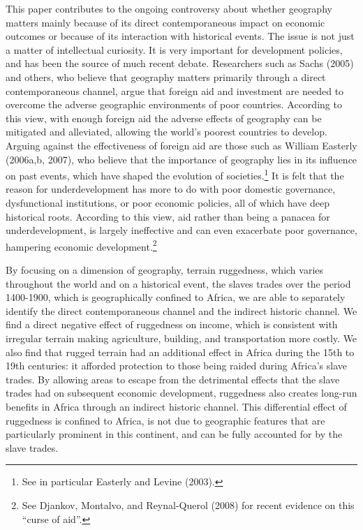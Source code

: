 \documentclass[
  letterpaper,
  DIV=11,
  numbers=noendperiod]{scrartcl}
\begin{document}
This paper contributes to the ongoing controversy about whether
geography matters mainly because of its direct contemporaneous impact on
economic outcomes or because of its interaction with historical events.
The issue is not just a matter of intellectual curiosity. It is very
important for development policies, and has been the source of much
recent debate. Researchers such as Sachs (2005) and others, who believe
that geography matters primarily through a direct contemporaneous
channel, argue that foreign aid and investment are needed to overcome
the adverse geographic environments of poor countries. According to this
view, with enough foreign aid the adverse effects of geography can be
mitigated and alleviated, allowing the world's poorest countries to
develop. Arguing against the effectiveness of foreign aid are those such
as William Easterly (2006a,b, 2007), who believe that the importance of
geography lies in its influence on past events, which have shaped the
evolution of societies.\footnote{See in particular Easterly and Levine
  (2003).} It is felt that the reason for underdevelopment has more to
do with poor domestic governance, dysfunctional institutions, or poor
economic policies, all of which have deep historical roots. According to
this view, aid rather than being a panacea for underdevelopment, is
largely ineffective and can even exacerbate poor governance, hampering
economic development.\footnote{See Djankov, Montalvo, and Reynal-Querol
  (2008) for recent evidence on this ``curse of aid''.}

By focusing on a dimension of geography, terrain ruggedness, which
varies throughout the world and on a historical event, the slaves trades
over the period 1400-1900, which is geographically confined to Africa,
we are able to separately identify the direct contemporaneous channel
and the indirect historic channel. We find a direct negative effect of
ruggedness on income, which is consistent with irregular terrain making
agriculture, building, and transportation more costly. We also find that
rugged terrain had an additional effect in Africa during the 15th to
19th centuries: it afforded protection to those being raided during
Africa's slave trades. By allowing areas to escape from the detrimental
effects that the slave trades had on subsequent economic development,
ruggedness also creates long-run benefits in Africa through an indirect
historic channel. This differential effect of ruggedness is confined to
Africa, is not due to geographic features that are particularly
prominent in this continent, and can be fully accounted for by the slave
trades.
\end{document}
